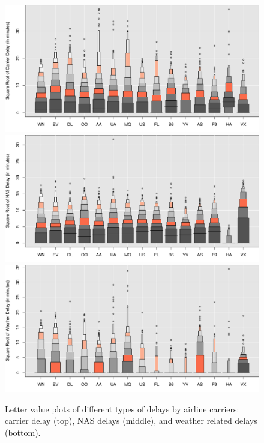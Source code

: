 \documentclass[12pt,oneside]{article}
\begin{document}
\begin{figure}[htbp] %
   \centering
   \includegraphics[width=.8\linewidth]{carrier-lv} 
   \includegraphics[width=.8\linewidth]{nas-lv} 
   \includegraphics[width=.8\linewidth]{weather-lv} 
   \caption{Letter value plots of different types of delays by airline carriers: carrier delay (top), NAS delays (middle), and weather related delays (bottom). }
   \label{fig:xpl:delays}
\end{figure}
\end{document}
